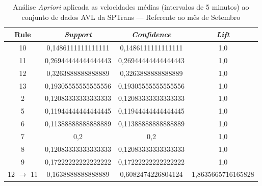 \documentclass[
	12pt,				%
	oneside,			%
	a4paper,			%
	english,			%
	brazil				%
	]{abntex2ppgsi}
\begin{document}
{{\begin{apendicesenv}
\begin{table}[!htb]
\centering
\caption {Análise \textit{Apriori} aplicada as velocidades médias (intervalos de 5 minutos) ao conjunto de dados AVL da SPTrans --- Referente ao mês de Setembro}
\label {tab:aprioriSeptember}
\begin{tabular}{c|c|c|c}
\hline
\textbf{Rule} & \textit{\textbf{Support}} & \textit{\textbf{Confidence}} & \textit{\textbf{Lift}} \\
\hline
10 &  0,1486111111111111 &  0,1486111111111111 &  1,0\\
\hline
11 &  0,26944444444444443 &  0,26944444444444443 &  1,0\\
\hline
12 &  0,3263888888888889 &  0,3263888888888889 &  1,0\\
\hline
13 &  0,19305555555555556 &  0,19305555555555556 &  1,0\\
\hline
2 &  0,12083333333333333 &  0,12083333333333333 &  1,0\\
\hline
5 &  0,11944444444444445 &  0,11944444444444445 &  1,0\\
\hline
6 &  0,11388888888888889 &  0,11388888888888889 &  1,0\\
\hline
7 &  0,2 &  0,2 &  1,0\\
\hline
8 &  0,12083333333333333 &  0,12083333333333333 &  1,0\\
\hline
9 &  0,17222222222222222 &  0,17222222222222222 &  1,0\\
\hline
12 $\rightarrow$ 11 &  0,1638888888888889 &  0,6082474226804124 &  1,8635665716165828\\
\hline
\end{tabular}
\end{table}



\end{apendicesenv}}}
\end{document}
